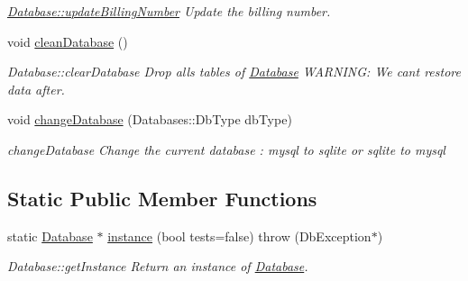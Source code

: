\begin{DoxyCompactItemize}
\begin{DoxyCompactList}\small\item\em \hyperlink{classDatabases_1_1Database_a17b652086514e0a64d0e452a938ac7a5}{Database\+::update\+Billing\+Number} Update the billing number. \end{DoxyCompactList}\item 
\hypertarget{classDatabases_1_1Database_a52c30975504e35c7c475a52817d66b73}{}void \hyperlink{classDatabases_1_1Database_a52c30975504e35c7c475a52817d66b73}{clean\+Database} ()\label{classDatabases_1_1Database_a52c30975504e35c7c475a52817d66b73}

\begin{DoxyCompactList}\small\item\em Database\+::clear\+Database Drop alls tables of \hyperlink{classDatabases_1_1Database}{Database} W\+A\+R\+N\+I\+N\+G\+: We can\textquotesingle{}t restore data after. \end{DoxyCompactList}\item 
void \hyperlink{classDatabases_1_1Database_a7d5635c502e3eab85635c35a7b3a81e1}{change\+Database} (Databases\+::\+Db\+Type db\+Type)
\begin{DoxyCompactList}\small\item\em change\+Database Change the current database \+: mysql to sqlite or sqlite to mysql \end{DoxyCompactList}\end{DoxyCompactItemize}
\subsection*{Static Public Member Functions}
\begin{DoxyCompactItemize}
\item 
static \hyperlink{classDatabases_1_1Database}{Database} $\ast$ \hyperlink{classDatabases_1_1Database_a3cf57f0af08ad3f4d588d59eafcadb56}{instance} (bool tests=false)  throw (\+Db\+Exception$\ast$)
\begin{DoxyCompactList}\small\item\em Database\+::get\+Instance Return an instance of \hyperlink{classDatabases_1_1Database}{Database}. \end{DoxyCompactList}\end{DoxyCompactItemize}
